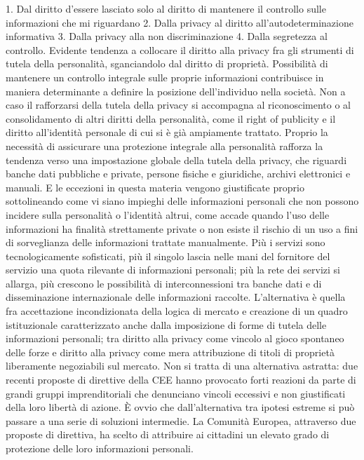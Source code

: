 1.	Dal diritto d’essere lasciato solo al diritto di mantenere il controllo sulle informazioni che mi riguardano
2.	Dalla privacy al diritto all’autodeterminazione informativa
3.	Dalla privacy alla non discriminazione
4.	Dalla segretezza al controllo.
Evidente tendenza a collocare il diritto alla privacy fra gli strumenti di tutela della personalità, sganciandolo dal diritto di proprietà. Possibilità di mantenere un controllo integrale sulle proprie informazioni contribuisce in maniera determinante a definire la posizione dell’individuo nella società. Non a caso il rafforzarsi della tutela della privacy si accompagna al riconoscimento o al consolidamento di altri diritti della personalità, come il right of publicity e il diritto all’identità personale di cui si è già ampiamente trattato.
Proprio la necessità di assicurare una protezione integrale alla personalità rafforza la tendenza verso una impostazione globale della tutela della privacy, che riguardi banche dati pubbliche e private, persone fisiche e giuridiche, archivi elettronici e manuali. E le eccezioni in questa materia vengono giustificate proprio sottolineando come vi siano impieghi delle informazioni personali che non possono incidere sulla personalità o l’identità altrui, come accade quando l’uso delle informazioni ha finalità strettamente private o non esiste il rischio di un uso a fini di sorveglianza delle informazioni trattate manualmente.
Più i servizi sono tecnologicamente sofisticati, più il singolo lascia nelle mani del fornitore del servizio una quota rilevante di informazioni personali; più la rete dei servizi si allarga, più crescono le possibilità di interconnessioni tra banche dati e di disseminazione internazionale delle informazioni raccolte.
L’alternativa è quella fra accettazione incondizionata della logica di mercato e creazione di un quadro istituzionale caratterizzato anche dalla imposizione di forme di tutela delle informazioni personali; tra diritto alla privacy come vincolo al gioco spontaneo delle forze e diritto alla privacy come mera attribuzione di titoli di proprietà liberamente negoziabili sul mercato.
Non si tratta di una alternativa astratta: due recenti proposte di direttive della CEE hanno provocato forti reazioni da parte di grandi gruppi imprenditoriali che denunciano vincoli eccessivi e non giustificati della loro libertà di azione.
È ovvio che dall’alternativa tra ipotesi estreme si può passare a una serie di soluzioni intermedie.
La Comunità Europea, attraverso due proposte di direttiva, ha scelto di attribuire ai cittadini un elevato grado di protezione delle loro informazioni personali.

